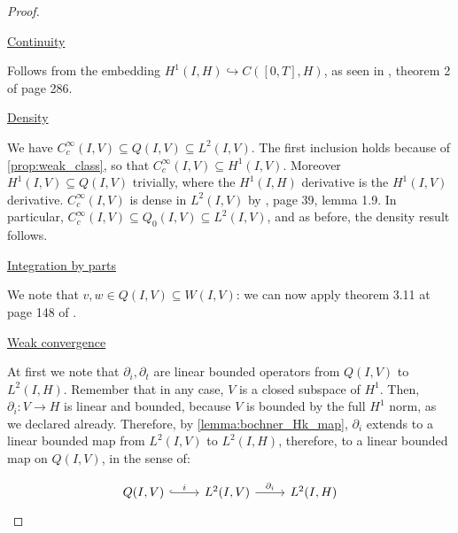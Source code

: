 \documentclass[english,a4paper,9pt,oneside]{scrbook}	%
\theoremstyle{break}
\newenvironment{mproof}[1][\proofname]{%
  \begin{proof}[#1]$ $\par\nobreak\ignorespaces
}{%
  \end{proof}
}
\renewcommand*{\proofname}{Proof}
\theoremstyle{remark}
\newcommand{\emb}{\hookrightarrow}
\newcommand{\ind}[1]{\{\text{ #1 }\}}
\begin{document}
\begin{appendices}
\begin{mproof}
\underline{Continuity}

Follows from the embedding $H^1(I,H)\emb C([0,T],H)$, as seen in \cite{evans}, theorem 2 of page 286.

\underline{Density}

We have $C_c^\infty(I,V) \subseteq Q(I,V) \subseteq L^2(I,V)$. The first inclusion holds because of \cref{prop:weak_class}, so that $C_c^\infty(I,V)\subseteq H^1(I,V)$. Moreover $H^1(I,V)\subseteq  Q(I,V) $ trivially, where the $H^1(I,H)$ derivative is the $H^1(I,V)$ derivative. $C_c^\infty(I,V)$ is dense in $ L^2(I,V)$ by \cite{hinze}, page 39, lemma 1.9. In particular,  $C_c^\infty(I,V) \subseteq Q_0(I,V)\subseteq L^2(I,V)$, and as before, the density result follows.

%
%
%
%
%
%
%
\underline{Integration by parts}

We note that $v,w \in Q(I,V)\subseteq W(I,V)$: we can now apply theorem 3.11 at page 148 of \cite{trol}.

\underline{Weak convergence}

At first we note that $\partial_i, \partial_t$ are linear bounded operators from $Q(I,V)$ to $L^2(I,H)$.
Remember that in any case, $V$ is a closed subspace of $H^1$. Then, $\partial_i : V\rightarrow H$ is linear and bounded, because $V$ is bounded by the full $H^1$ norm, as we declared already.
Therefore, by \cref{lemma:bochner_Hk_map}, $\partial_i$ extends to a linear bounded map from $L^2(I,V)$ to $L^2(I,H)$, therefore, to a linear bounded map on $Q(I,V)	$, in the sense of:

\[\begin{tikzcd}
	{Q(I,V)} & {L^2(I,V)} & {L^2(I,H)}
	\arrow["i", hook, from=1-1, to=1-2]
	\arrow["{\partial_i}", from=1-2, to=1-3]
\end{tikzcd}\]


\end{mproof}
\end{appendices}
\end{document}
